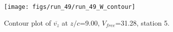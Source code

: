 \begin{figure}[H]
\centering
\texttt{[image: figs/run\_49/run\_49\_W\_contour]}
\caption{Contour plot of $\overline{v_{z}}$ at $z/c$=9.00, $V_{free}$=31.28, station 5.}
\label{fig:run_49_W_contour}
\end{figure}


